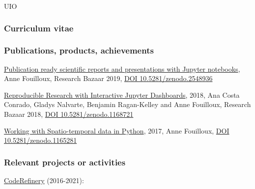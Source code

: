 \begin{sitedescription}{UIO}
\subsubsection*{Curriculum vitae}




%
%
%


\subsubsection*{Publications, products, achievements}

\begin{compactenum}
\item \href{https://annefou.github.io/jupyter_publish/}{Publication ready scientific reports and presentations with Jupyter notebooks}, Anne Fouilloux, Research Bazaar 2019, \href{https://zenodo.org/badge/latestdoi/163517733}{DOI 10.5281/zenodo.2548936}

\item \href{https://annefou.github.io/jupyter_dashboards/}{Reproducible Research with Interactive Jupyter Dashboards}, 2018, Ana Costa Conrado, Gladys Nalvarte, Benjamin Ragan-Kelley and Anne Fouilloux, Research Bazaar 2018, \href{https://zenodo.org/badge/latestdoi/114125668}{DOI 10.5281/zenodo.1168721}

\item \href{https://annefou.github.io/metos_python/}{Working with Spatio-temporal data in Python}, 2017, Anne Fouilloux, \href{https://zenodo.org/badge/latestdoi/96184802}{DOI 10.5281/zenodo.1165281}
\end{compactenum}

\subsubsection*{Relevant projects or activities}

\begin{compactenum}
\item \href{https://coderefinery.org}{CodeRefinery} \label{desc:coderefinery} (2016-2021): 



\end{compactenum}
\end{sitedescription}
